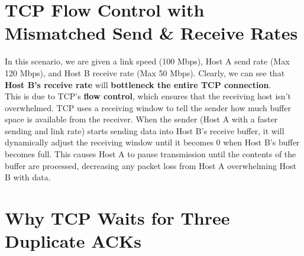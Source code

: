 \documentclass{article}
\begin{document}

\section{TCP Flow Control with Mismatched Send \& Receive Rates}
In this scenario, we are given a link speed (100 Mbps), Host A send rate (Max 120 Mbps), and Host B receive rate (Max 50 Mbps). Clearly, we can see that \textbf{Host B's receive rate} will \textbf{bottleneck the entire TCP connection}. \\
This is due to TCP's \textbf{flow control}, which ensures that the receiving host isn't overwhelmed. TCP uses a receiving window to tell the sender how much buffer space is available from the receiver. When the sender (Host A with a faster sending and link rate) starts sending data into Host B's receive buffer, it will dynamically adjust the receiving window until it becomes 0 when Host B's buffer becomes full. This causes Host A to pause transmission until the contents of the buffer are processed, decreasing any packet loss from Host A overwhelming Host B with data.

\setcounter{section}{35}
\section{Why TCP Waits for Three Duplicate ACKs}
\end{document}
